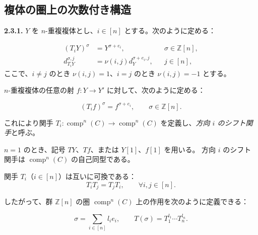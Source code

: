 \clearpage
{}%
\subsection{複体の圏上の次数付き構造}

\noindent\textbf{2.3.1.}\quad
$Y$ を $n$-重複複体とし、$i\in[n]$ とする。次のように定める：

\begin{equation}
  \begin{aligned}
    (T_iY)^\sigma&=Y^{\sigma+e_i},
      &&\sigma\in\mathbb Z[n],\\
    d_{T_iY}^{\sigma,j}&=\nu(i,j)d_Y^{\sigma+e_i,j},
      &&j\in[n],
  \end{aligned}
  \tag{2.3.1.1}
\end{equation}
ここで、$i\ne j$ のとき $\nu(i,j)=1$、$i=j$ のとき $\nu(i,j)=-1$ とする。

$n$-重複複体の任意の射
$f\colon Y\longrightarrow Y'$ に対して、次のように定める：

\begin{equation}
  (T_if)^\sigma=f^{\sigma+e_i},
  \qquad \sigma\in\mathbb Z[n].
  \tag{2.3.1.2}
\end{equation}

これにより関手
$T_i\colon\operatorname{comp}^{n}(C)\longrightarrow
\operatorname{comp}^{n}(C)$ を定義し、\emph{方向 $i$ のシフト関手}と呼ぶ。

$n=1$ のとき、記号 $TY$、$Tf$、または $Y[1]$、$f[1]$ を用いる。
方向 $i$ のシフト関手は $\operatorname{comp}^{n}(C)$ の自己同型である。

関手 $T_i$（$i\in[n]$）は互いに可換である：
\begin{equation}
  T_iT_j=T_jT_i,
  \qquad \forall i,j\in[n].
  \tag{2.3.1.3}
\end{equation}

したがって、群 $\mathbb Z[n]$ の圏
$\operatorname{comp}^{n}(C)$ 上の作用を次のように定義できる：

\begin{equation}
  \sigma=\sum_{i\in[n]}l_ie_i,
  \qquad
  T(\sigma)=T_1^{l_1}\cdots T_n^{l_n}.
  \tag{2.3.1.4}
\end{equation}

